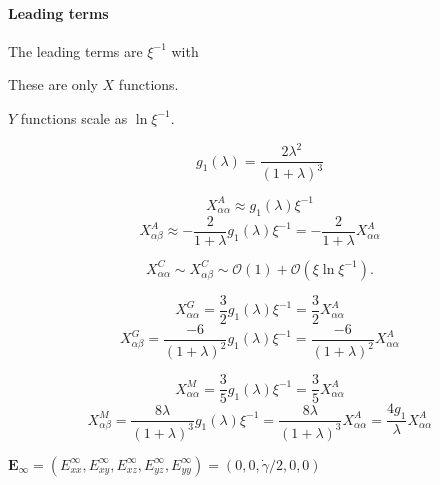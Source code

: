 \documentclass[12pt]{article}
\begin{document}
\paragraph{Leading terms}

The leading terms are $\xi^{-1}$ with 




These are only $X$ functions.

$Y$ functions scale as $\ln \xi^{-1}$.


\begin{equation*}
 g_1 (\lambda)
= \frac{2\lambda^2}{(1+\lambda)^3}
\end{equation*}

\begin{equation*}
 X_{\alpha\alpha}^{A}
\approx 
g_1(\lambda) \xi^{-1}
\end{equation*}
\begin{equation*}
 X_{\alpha\beta}^{A}
\approx
-\frac{2}{1+\lambda}g_1(\lambda) \xi^{-1}
 = 
-\frac{2}{1+\lambda} X_{\alpha\alpha}^{A} 
\end{equation*}

\begin{equation*}
 X_{\alpha\alpha}^{C} 
\sim
 X_{\alpha\beta}^{C}
\sim
\mathcal{O}(1) + \mathcal{O}(\xi \ln \xi^{-1}).
\end{equation*}

\begin{equation*}
 X_{\alpha\alpha}^{G}
= \frac{3}{2}g_1(\lambda) \xi^{-1}
= \frac{3}{2} X_{\alpha\alpha}^{A} 
\end{equation*}
\begin{equation*}
 X_{\alpha \beta}^{G}
=
\frac{-6}{(1+\lambda)^2}
g_1 (\lambda) \xi^{-1}
= 
\frac{-6}{(1+\lambda)^2} X_{\alpha\alpha}^{A}
\end{equation*}

\begin{equation*}
 X_{\alpha \alpha}^{M}
=
\frac{3}{5} g_1(\lambda) \xi^{-1}
= \frac{3}{5} X_{\alpha\alpha}^{A}
\end{equation*}
\begin{equation}
 X_{\alpha \beta}^{M}
=
\frac{8\lambda}{(1+\lambda)^3} g_1(\lambda) \xi^{-1}
= 
\frac{8\lambda}{(1+\lambda)^3} X_{\alpha\alpha}^{A}
= 
\frac{4g_1}{\lambda} X_{\alpha\alpha}^{A}
\end{equation}


\newpage

$\bm{E}_{\infty} = 
(E_{xx}^{\infty},
E_{xy}^{\infty},
E_{xz}^{\infty},
E_{yz}^{\infty},
E_{yy}^{\infty}
)
=
(0, 0, \dot{\gamma}/2, 0, 0) $
\end{document}
